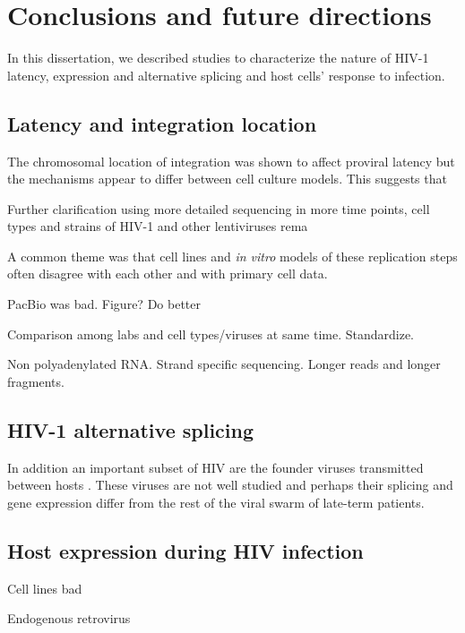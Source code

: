 \documentclass[../sherrill-Mix_thesis.tex]{subfiles}
\begin{document}
\chapter{Conclusions and future directions}
\graphicspath{{im/}{conclusion/im/}}

In this dissertation, we described studies to characterize the nature of HIV-1 latency, expression and alternative splicing and host cells' response to infection.

\section{Latency and integration location}

The chromosomal location of integration was shown to affect proviral latency but the mechanisms appear to differ between cell culture models. This suggests that 


Further clarification using more detailed sequencing in more time points, cell types and strains of HIV-1 and other lentiviruses rema

A common theme was that cell lines and \textit{in vitro} models of these replication steps often disagree with each other and with primary cell data. 

PacBio was bad. Figure? Do better

Comparison among labs and cell types/viruses at same time. Standardize.

Non polyadenylated RNA. Strand specific sequencing. Longer reads and longer fragments.

\section{HIV-1 alternative splicing}
In addition an important subset of HIV are the founder viruses transmitted between hosts \citep{Keele2008,Salazar-Gonzalez2009}. These viruses are not well studied and perhaps their splicing and gene expression differ from the rest of the viral swarm of late-term patients.

\section{Host expression during HIV infection}

Cell lines bad

Endogenous retrovirus
\end{document}
